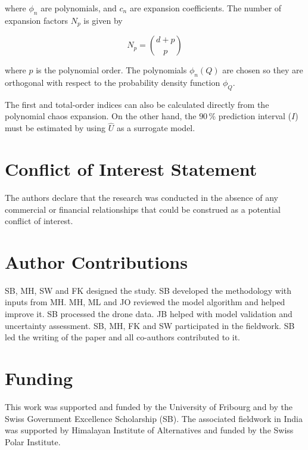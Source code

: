 \documentclass[utf8]{frontiersSCNS}
\begin{document}
where $\phi_n$ are polynomials, and $c_n$ are expansion coefficients. The number of expansion factors $N_p$ is
given by

\begin{equation}
  N_p = \binom{d+p}{p}
\end{equation}

where $p$ is the polynomial order. The polynomials $\phi_n(Q)$ are chosen so they are orthogonal with respect to the
probability density function $\phi_Q$.

The first and total-order indices can also be calculated directly from the polynomial chaos expansion. On the
other hand, the $90\, \%$ prediction interval ($I$) must be estimated by using $\hat{U}$ as a surrogate
model.

\section*{Conflict of Interest Statement} The authors declare that the research was conducted in the absence of
any commercial or financial relationships that could be construed as a potential conflict of interest.

\section*{Author Contributions} SB, MH, SW and FK designed the study.  SB developed the methodology with inputs
from MH.  MH, ML and JO reviewed the model algorithm and helped improve it. SB processed the drone data. JB helped
with model validation and uncertainty assessment. SB, MH, FK and SW participated in the fieldwork.  SB led the
writing of the paper and all co-authors contributed to it.

\section*{Funding} This work was supported and funded by the University of Fribourg and by the Swiss Government
Excellence Scholarship (SB). The associated fieldwork in India was supported by Himalayan Institute of
Alternatives and funded by the Swiss Polar Institute.
\end{document}
